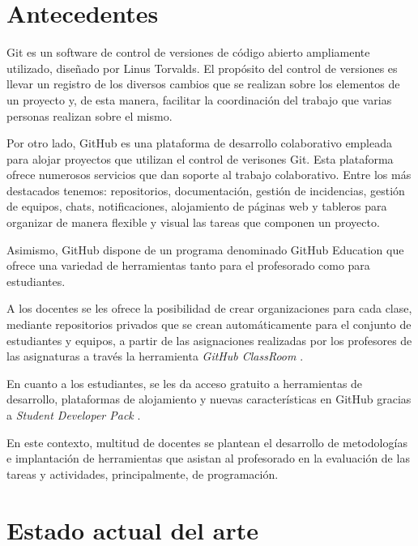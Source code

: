 
\section{Antecedentes}
\label{1:sec:1}

Git es un software de control de versiones de código abierto ampliamente utilizado, diseñado por Linus Torvalds.
El propósito del control de versiones es llevar un registro de los diversos cambios que se realizan sobre
los elementos de un proyecto y, de esta manera, facilitar la coordinación del trabajo que varias personas
realizan sobre el mismo.
\bigskip

Por otro lado, GitHub es una plataforma de desarrollo colaborativo empleada para alojar proyectos que utilizan el control de verisones Git.
Esta plataforma ofrece numerosos servicios que dan soporte al trabajo colaborativo. Entre los más destacados tenemos: repositorios, documentación,
gestión de incidencias, gestión de equipos, chats, notificaciones, alojamiento de páginas web y tableros para organizar de manera flexible y visual las tareas que componen un proyecto.
\bigskip

Asimismo, GitHub dispone de un programa denominado GitHub Education que ofrece una variedad de herramientas tanto para el profesorado como para estudiantes.
\bigskip

A los docentes se les ofrece la posibilidad de crear organizaciones para cada clase, mediante repositorios privados que se crean automáticamente para el conjunto de estudiantes y equipos,
a partir de las asignaciones realizadas por los profesores de las asignaturas a través la herramienta {\it GitHub ClassRoom }.
\bigskip

En cuanto a los estudiantes, se les da acceso gratuito a herramientas de desarrollo, plataformas de alojamiento y nuevas características en GitHub gracias a {\it Student Developer Pack }.
\bigskip

En este contexto, multitud de docentes se plantean el desarrollo de metodologías e implantación de herramientas
que asistan al profesorado en la evaluación de las tareas y actividades, principalmente, de programación.
\section{Estado actual del arte}
\label{1:sec:2}


